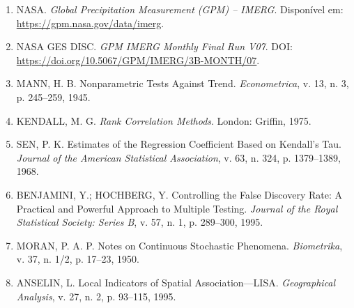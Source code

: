 \documentclass[12pt,a4paper]{article}
\begin{document}
\begin{enumerate}

    \item NASA. \textit{Global Precipitation Measurement
    (GPM) -- IMERG}. Disponível em:
    \url{https://gpm.nasa.gov/data/imerg}.

    \item NASA GES DISC. \textit{GPM IMERG Monthly Final
    Run V07}. DOI:
    \url{https://doi.org/10.5067/GPM/IMERG/3B-MONTH/07}.

    \item MANN, H. B. Nonparametric Tests Against Trend.
    \textit{Econometrica}, v. 13, n. 3, p. 245--259, 1945.

    \item KENDALL, M. G. \textit{Rank Correlation Methods}.
    London: Griffin, 1975.

    \item SEN, P. K. Estimates of the Regression
    Coefficient Based on Kendall's Tau.
    \textit{Journal of the American Statistical
    Association}, v. 63, n. 324, p. 1379--1389, 1968.

    \item BENJAMINI, Y.; HOCHBERG, Y. Controlling the
    False Discovery Rate: A Practical and Powerful
    Approach to Multiple Testing.
    \textit{Journal of the Royal Statistical Society:
    Series B}, v. 57, n. 1, p. 289--300, 1995.

    \item MORAN, P. A. P. Notes on Continuous Stochastic
    Phenomena. \textit{Biometrika}, v. 37, n. 1/2,
    p. 17--23, 1950.

    \item ANSELIN, L. Local Indicators of Spatial
    Association---LISA.
    \textit{Geographical Analysis}, v. 27, n. 2,
    p. 93--115, 1995.

\end{enumerate}
\end{document}
